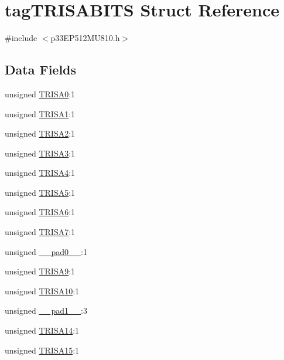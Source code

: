 \hypertarget{structtag_t_r_i_s_a_b_i_t_s}{}\section{tag\+T\+R\+I\+S\+A\+B\+I\+TS Struct Reference}
\label{structtag_t_r_i_s_a_b_i_t_s}


{\ttfamily \#include $<$p33\+E\+P512\+M\+U810.\+h$>$}

\subsection*{Data Fields}
\begin{DoxyCompactItemize}
\item 
unsigned \hyperlink{structtag_t_r_i_s_a_b_i_t_s_a5b058659efa978bacb96a404cfdbe610}{T\+R\+I\+S\+A0}\+:1
\item 
unsigned \hyperlink{structtag_t_r_i_s_a_b_i_t_s_ab129bf45a7e3be70a0acfea93d291273}{T\+R\+I\+S\+A1}\+:1
\item 
unsigned \hyperlink{structtag_t_r_i_s_a_b_i_t_s_af6281130cf7baba87c8550bd35d9d76d}{T\+R\+I\+S\+A2}\+:1
\item 
unsigned \hyperlink{structtag_t_r_i_s_a_b_i_t_s_a1a2488028e463b824d503f740b999146}{T\+R\+I\+S\+A3}\+:1
\item 
unsigned \hyperlink{structtag_t_r_i_s_a_b_i_t_s_a9f5eacb9cb6d29d89451ce640a6057ae}{T\+R\+I\+S\+A4}\+:1
\item 
unsigned \hyperlink{structtag_t_r_i_s_a_b_i_t_s_ae459cb825f88b23841a1fe1c65878399}{T\+R\+I\+S\+A5}\+:1
\item 
unsigned \hyperlink{structtag_t_r_i_s_a_b_i_t_s_a42bb066347a0919a8609bc10e28eb6c2}{T\+R\+I\+S\+A6}\+:1
\item 
unsigned \hyperlink{structtag_t_r_i_s_a_b_i_t_s_a41543e8aa038b05d2620c4808cef7023}{T\+R\+I\+S\+A7}\+:1
\item 
unsigned \hyperlink{structtag_t_r_i_s_a_b_i_t_s_adf71f3d8410c1f1dbbc96680a92c49af}{\+\_\+\+\_\+pad0\+\_\+\+\_\+}\+:1
\item 
unsigned \hyperlink{structtag_t_r_i_s_a_b_i_t_s_ae739ca5b12324ecd748bfdffcec6cc65}{T\+R\+I\+S\+A9}\+:1
\item 
unsigned \hyperlink{structtag_t_r_i_s_a_b_i_t_s_ac626668d925fd254f61c66d8df11e0bf}{T\+R\+I\+S\+A10}\+:1
\item 
unsigned \hyperlink{structtag_t_r_i_s_a_b_i_t_s_acaf2d0924a107ec6e8d2e31febaf66f9}{\+\_\+\+\_\+pad1\+\_\+\+\_\+}\+:3
\item 
unsigned \hyperlink{structtag_t_r_i_s_a_b_i_t_s_a1505893d2edeb31ef2de5a5e2ebf9bd3}{T\+R\+I\+S\+A14}\+:1
\item 
unsigned \hyperlink{structtag_t_r_i_s_a_b_i_t_s_a2955a3275d7e62d874c893367e783771}{T\+R\+I\+S\+A15}\+:1
\end{DoxyCompactItemize}


